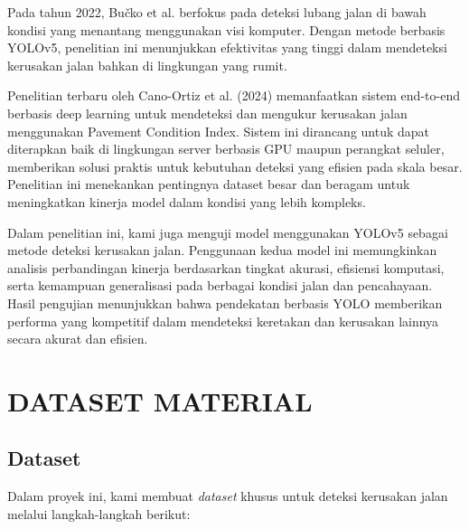 \documentclass[12pt,a4paper]{article}
\begin{document}
\begin{adjustwidth}{3em}{0pt}
\hspace{0.5cm} Pada tahun 2022, Bučko et al. berfokus pada deteksi lubang jalan di bawah kondisi yang menantang menggunakan visi komputer. Dengan metode berbasis YOLOv5, penelitian ini menunjukkan efektivitas yang tinggi dalam mendeteksi kerusakan jalan bahkan di lingkungan yang rumit.

\hspace{0.5cm} Penelitian terbaru oleh Cano-Ortiz et al. (2024) memanfaatkan sistem end-to-end berbasis deep learning untuk mendeteksi dan mengukur kerusakan jalan menggunakan Pavement Condition Index. Sistem ini dirancang untuk dapat diterapkan baik di lingkungan server berbasis GPU maupun perangkat seluler, memberikan solusi praktis untuk kebutuhan deteksi yang efisien pada skala besar. Penelitian ini menekankan pentingnya dataset besar dan beragam untuk meningkatkan kinerja model dalam kondisi yang lebih kompleks.

\hspace{0.5cm} Dalam penelitian ini, kami juga menguji model menggunakan YOLOv5 sebagai metode deteksi kerusakan jalan. Penggunaan kedua model ini memungkinkan analisis perbandingan kinerja berdasarkan tingkat akurasi, efisiensi komputasi, serta kemampuan generalisasi pada berbagai kondisi jalan dan pencahayaan. Hasil pengujian menunjukkan bahwa pendekatan berbasis YOLO memberikan performa yang kompetitif dalam mendeteksi keretakan dan kerusakan lainnya secara akurat dan efisien. \end{adjustwidth}

\section{DATASET MATERIAL}
\subsection{Dataset}

Dalam proyek ini, kami membuat \textit{dataset} khusus untuk deteksi kerusakan jalan melalui langkah-langkah berikut:
\end{document}
